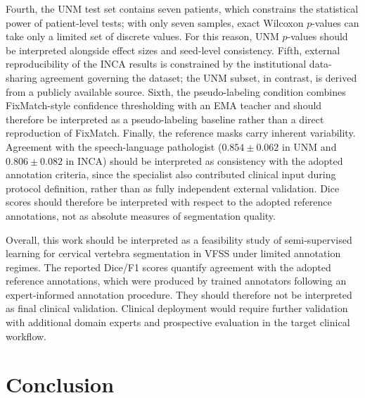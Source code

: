 \documentclass[
  msc,
  american
]{ThesisPUC_v2}
\begin{document}
Fourth, the UNM test set contains seven patients, which constrains the statistical power of patient-level tests; with only seven samples, exact Wilcoxon $p$-values can take only a limited set of discrete values. For this reason, UNM $p$-values should be interpreted alongside effect sizes and seed-level consistency. Fifth, external reproducibility of the INCA results is constrained by the institutional data-sharing agreement governing the dataset; the UNM subset, in contrast, is derived from a publicly available source. Sixth, the pseudo-labeling condition combines FixMatch-style confidence thresholding with an EMA teacher and should therefore be interpreted as a pseudo-labeling baseline rather than a direct reproduction of FixMatch. Finally, the reference masks carry inherent variability. Agreement with the speech-language pathologist ($0.854 \pm 0.062$ in UNM and $0.806 \pm 0.082$ in INCA) should be interpreted as consistency with the adopted annotation criteria, since the specialist also contributed clinical input during protocol definition, rather than as fully independent external validation. Dice scores should therefore be interpreted with respect to the adopted reference annotations, not as absolute measures of segmentation quality.

Overall, this work should be interpreted as a feasibility study of semi-supervised learning for cervical vertebra segmentation in VFSS under limited annotation regimes. The reported Dice/F1 scores quantify agreement with the adopted reference annotations, which were produced by trained annotators following an expert-informed annotation procedure. They should therefore not be interpreted as final clinical validation. Clinical deployment would require further validation with additional domain experts and prospective evaluation in the target clinical workflow.



\chapter{Conclusion}
\label{chap:conclusion}
\end{document}
